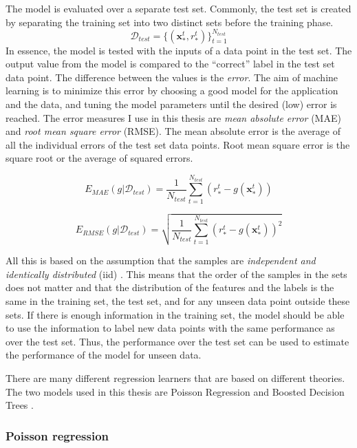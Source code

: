 The model is evaluated over a separate test set.
Commonly, the test set is created by separating the training set into two distinct sets before the training phase.
$$\mathcal{D}_{test} = \{ (\mathbf{x}_*^t , r_*^t) \}_{t=1}^{N_{test}}$$
In essence, the model is tested with the inputs of a data point in the test set. The output value from the model is compared to the ``correct'' label in the test set data point.
The difference between the values is the \emph{error}.
The aim of machine learning is to minimize this error by choosing a good model for the application and the data, and tuning the model parameters until the desired (low) error is reached.
The error measures I use in this thesis are \textit{mean absolute error} (MAE) and \textit{root mean square error} (RMSE).
The mean absolute error is the average of all the individual errors of the test set data points.
Root mean square error is the square root or the average of squared errors.

$$E_{MAE}(g | \mathcal{D}_{test}) = \frac{1}{N_{test}} \sum_{t=1}^{N_{test}} (r_*^t - g(\mathbf{x}_*^t))$$

$$E_{RMSE}(g | \mathcal{D}_{test}) = \sqrt{ \frac{1}{N_{test}} \sum_{t=1}^{N_{test}} (r_*^t - g(\mathbf{x}_*^t))^2 }$$

All this is based on the assumption that the samples are \textit{independent and identically distributed} (iid) \cite{alpaydin}.
This means that the order of the samples in the sets does not matter and that the distribution of the features and the labels is the same in the training set, the test set, and for any unseen data point outside these sets.
If there is enough information in the training set, the model should be able to use the information to label new data points with the same performance as over the test set.
Thus, the performance over the test set can be used to estimate the performance of the model for unseen data.

There are many different regression learners that are based on different theories. The two models used in this thesis are Poisson Regression \cite{azurepoisson} and Boosted Decision Trees \cite{azurebdt}.

\subsubsection{Poisson regression}

